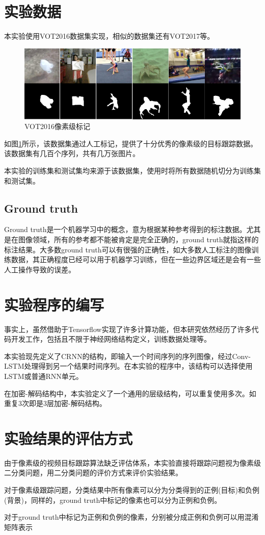 \section{实验数据}
本实验使用VOT2016数据集\supercite{Vojir-TR-2017-01}实现，相似的数据集还有VOT2017等。
\par
\begin{figure}[htbp!]
    \centering
    \includegraphics[width = 1.\textwidth]{chap/img/vot_2016_pixel.png}
    \caption{VOT2016像素级标记}\label{fig:vot_2016_pixel}
\end{figure}
\par
如图\ref{fig:vot_2016_pixel}所示，该数据集通过人工标记，提供了十分优秀的像素级的目标跟踪数据。该数据集有几百个序列，共有几万张图片。
\par
本实验的训练集和测试集均来源于该数据集，使用时将所有数据随机切分为训练集和测试集。
\subsection{Ground truth}
Ground truth是一个机器学习中的概念，意为根据某种参考得到的标注数据。尤其是在图像领域，所有的参考都不能被肯定是完全正确的，ground truth就指这样的标注结果。大多数ground truth可以有很强的正确性，如大多数人工标注的图像训练数据，其正确程度已经可以用于机器学习训练，但在一些边界区域还是会有一些人工操作导致的误差。

\section{实验程序的编写}
事实上，虽然借助于Tensorflow实现了许多计算功能，但本研究依然经历了许多代码开发工作，包括且不限于神经网络结构定义，训练数据处理等。
\par
本实验现先定义了CRNN的结构，即输入一个时间序列的序列图像，经过Conv-LSTM处理得到另一个结果时间序列。在本实验的程序中，该结构可以选择使用LSTM或普通RNN单元。
\par
在加密-解码结构中，本实验定义了一个通用的层级结构，可以重复使用多次。如重复3次即是3层加密-解码结构。

\section{实验结果的评估方式}
由于像素级的视频目标跟踪算法缺乏评估体系，本实验直接将跟踪问题视为像素级二分类问题，用二分类问题的评价方式来评价实验结果。
\par
对于像素级跟踪问题，分类结果中所有像素可以分为分类得到的正例(目标)和负例(背景)，同样的，ground truth中标记的像素也可以分为正例和负例。
\par
对于ground truth中标记为正例和负例的像素，分别被分成正例和负例可以用混淆矩阵表示
